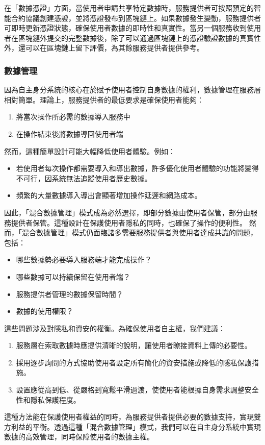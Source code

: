在「數據憑證」方面，當使用者申請共享特定數據時，服務提供者可按照預定的智能合約協議創建憑證，並將憑證發布到區塊鏈上。如果數據發生變動，服務提供者可即時更新憑證狀態，確保使用者數據的即時性和真實性。當另一個服務收到使用者在區塊鏈外提交的完整數據後，除了可以通過區塊鏈上的憑證驗證數據的真實性外，還可以在區塊鏈上留下評價，為其餘服務提供者提供參考。
\subsubsection{數據管理}
因為自主身分系統的核心在於賦予使用者控制自身數據的權利，數據管理在服務層相對簡單。理論上，服務提供者的最低要求是確保使用者能夠：
\begin{enumerate}
  \item 將當次操作所必需的數據導入服務中
  \item 在操作結束後將數據導回使用者端
\end{enumerate}
然而，這種簡單設計可能大幅降低使用者體驗。例如：
\begin{itemize}
  \item 若使用者每次操作都需要導入和導出數據，許多優化使用者體驗的功能將變得不可行，因系統無法追蹤使用者歷史數據。
  \item 頻繁的大量數據導入導出會顯著增加操作延遲和網路成本。
\end{itemize}
因此，「混合數據管理」模式成為必然選擇，即部分數據由使用者保管，部分由服務提供者保管。這種設計在保護使用者隱私的同時，也確保了操作的便利性。
然而，「混合數據管理」模式仍面臨諸多需要服務提供者與使用者達成共識的問題，包括：
\begin{itemize}
  \item 哪些數據勢必要導入服務端才能完成操作？
  \item 哪些數據可以持續保留在使用者端？
  \item 服務提供者管理的數據保留時間？
  \item 數據的使用權限？
\end{itemize}
這些問題涉及對隱私和資安的權衡。為確保使用者自主權，我們建議：
\begin{enumerate}
  \item 服務層在索取數據時應提供清晰的說明，讓使用者瞭接資料上傳的必要性。
  \item 採用逐步詢問的方式協助使用者設定所有簡化的資安措施或降低的隱私保護措施。
  \item 設置應從高到低、從嚴格到寬鬆平滑過渡，使使用者能根據自身需求調整安全性和隱私保護程度。
\end{enumerate}
這種方法能在保護使用者權益的同時，為服務提供者提供必要的數據支持，實現雙方利益的平衡。透過這種「混合數據管理」模式，我們可以在自主身分系統中實現數據的高效管理，同時保障使用者的數據主權。
